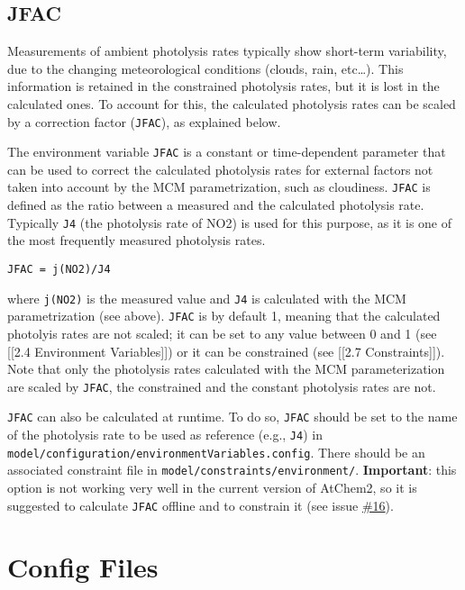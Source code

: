 \subsection{JFAC} \label{subsec:jfac}

Measurements of ambient photolysis rates typically show short-term
variability, due to the changing meteorological conditions (clouds,
rain, etc\ldots{}). This information is retained in the constrained
photolysis rates, but it is lost in the calculated ones. To account
for this, the calculated photolysis rates can be scaled by a
correction factor (\texttt{JFAC}), as explained below.

The environment variable \texttt{JFAC} is a constant or time-dependent
parameter that can be used to correct the calculated photolysis rates
for external factors not taken into account by the MCM
parametrization, such as cloudiness. \texttt{JFAC} is defined as the
ratio between a measured and the calculated photolysis rate. Typically
\texttt{J4} (the photolysis rate of NO2) is used for this purpose, as
it is one of the most frequently measured photolysis rates.

\begin{verbatim}
JFAC = j(NO2)/J4
\end{verbatim}

where \texttt{j(NO2)} is the measured value and \texttt{J4} is
calculated with the MCM parametrization (see above). \texttt{JFAC} is
by default 1, meaning that the calculated photolyis rates are not
scaled; it can be set to any value between 0 and 1 (see {[}{[}2.4
Environment Variables{]}{]}) or it can be constrained (see {[}{[}2.7
Constraints{]}{]}). Note that only the photolysis rates calculated
with the MCM parameterization are scaled by \texttt{JFAC}, the
constrained and the constant photolysis rates are not.

\texttt{JFAC} can also be calculated at runtime. To do so,
\texttt{JFAC} should be set to the name of the photolysis rate to be
used as reference (e.g., \texttt{J4}) in
\texttt{model/configuration/environmentVariables.config}. There should
be an associated constraint file in
\texttt{model/constraints/environment/}. \textbf{Important}: this
option is not working very well in the current version of AtChem2, so
it is suggested to calculate \texttt{JFAC} offline and to constrain it
(see issue \href{https://github.com/AtChem/AtChem2/issues/16}{\#16}).

\section{Config Files} \label{sec:config}

